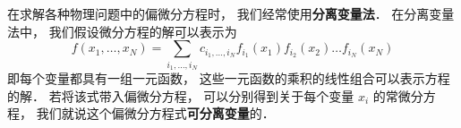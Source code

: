 
在求解各种物理问题中的偏微分方程时， 我们经常使用\textbf{分离变量法}． 在分离变量法中， 我们假设微分方程的解可以表示为
\begin{equation}
f(x_1, \dots , x_N) = \sum_{i_1, \dots, i_N} c_{i_1, \dots, i_N} f_{i_1}(x_1) f_{i_2}(x_2) \dots f_{i_N}(x_N)
\end{equation}
即每个变量都具有一组一元函数， 这些一元函数的乘积的线性组合可以表示方程的解． 若将该式带入偏微分方程， 可以分别得到关于每个变量 $x_i$ 的常微分方程， 我们就说这个偏微分方程式\textbf{可分离变量}的．

